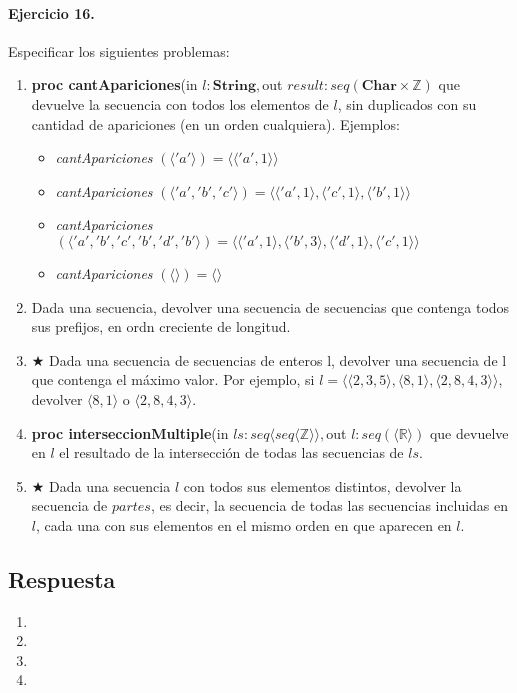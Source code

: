 \documentclass[a4paper]{article}
\begin{document}
\paragraph*{Ejercicio 16.} Especificar los siguientes problemas:
	\begin{enumerate}[label=\alph*)]
		\item \textbf{proc cantApariciones}(in $l:\textbf{String},$out $result :
			 seq(\textbf{Char}\times \mathbb{Z})$ que devuelve la secuencia con todos los elementos de $l$, sin duplicados con su cantidad de apariciones (en un orden cualquiera).
			  Ejemplos: \\
			 \begin{itemize}
			 	\item \textit{cantApariciones}
			 	$(\langle 'a'\rangle)=\langle \langle 'a',1\rangle \rangle$
			 	\item \textit{cantApariciones}
			 	$(\langle 'a','b','c'\rangle)=\langle \langle 'a',1\rangle ,\langle 'c',1\rangle
			 		,\langle 'b',1\rangle \rangle$
			 	\item \textit{cantApariciones}
			 	$(\langle 'a','b','c','b','d','b'\rangle)=\langle \langle 'a',1\rangle, 
			 	\langle 'b',3\rangle ,\langle 'd',1\rangle ,\langle 'c',1\rangle \rangle$
			 	\item \textit{cantApariciones}
			 	$(\langle \rangle)=\langle \rangle$
			 \end{itemize}
		\item Dada una secuencia, devolver una secuencia de secuencias que contenga todos sus
				prefijos, en ordn creciente de longitud.
		\item $\bigstar$ Dada una secuencia de secuencias de enteros l, devolver una secuencia de
				l que contenga el máximo valor. Por ejemplo, si $l=\langle 
				\langle 2,3,5\rangle , \langle 8,1\rangle , \langle 2,8,4,3\rangle\rangle$, 
				devolver $\langle 8,1\rangle$ o $\langle 2,8,4,3\rangle$.
		\item \textbf{proc interseccionMultiple}(in $ls:seq\langle seq\langle \mathbb{Z}\rangle
		 \rangle ,$out $l: seq(\langle \mathbb{R}\rangle)$ que devuelve en $l$ el resultado de 
		 		la intersección de todas las secuencias de $ls$.
		\item $\bigstar$ Dada una secuencia $l$ con todos sus elementos distintos, devolver la
				secuencia de $partes$, es decir, la secuencia de todas las secuencias incluidas
				en $l$, cada una con sus elementos en el mismo orden en que aparecen en $l$.
	\end{enumerate}
\subsection*{Respuesta}
	\begin{enumerate}[label=\alph*)]
		\item
		\item
		\item
		\item
	\end{enumerate}
	
\end{document}
